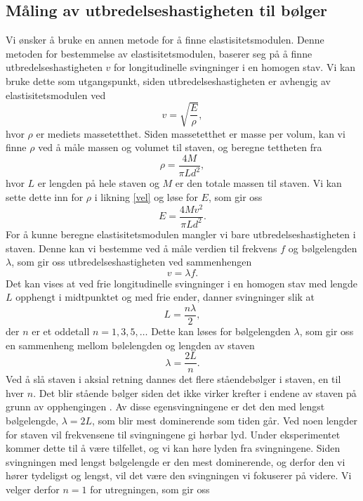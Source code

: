 \documentclass[%
 reprint,
nofootinbib,
aps,
]{revtex4-1}
\begin{document}
\subsection{Måling av utbredelseshastigheten til bølger}\label{teori-b}
Vi ønsker å bruke en annen metode for å finne elastisitetsmodulen. Denne metoden for bestemmelse av elastisitetsmodulen, baserer seg på å finne utbredelseshastigheten $v$ for longitudinelle svingninger i en homogen stav. Vi kan bruke dette som utgangspunkt, siden utbredelseshastigheten er avhengig av elastisitetsmodulen ved
\begin{equation}
  v = \sqrt{\frac{E}{\rho}},\label{vel}
\end{equation}
hvor $\rho$ er mediets massetetthet. Siden massetetthet er masse per volum, kan vi finne $\rho$ ved å måle massen og volumet til staven, og beregne tettheten fra
\begin{equation*}
  \rho = \frac{4M}{\pi L d^2},
\end{equation*}
hvor $L$ er lengden på hele staven og $M$ er den totale massen til staven. Vi kan sette dette inn for $\rho$ i likning \eqref{vel} og løse for $E$, som gir oss
\begin{equation}
  E = \frac{4Mv^2}{\pi L d^2}.\label{elast}
\end{equation}
For å kunne beregne elastisitetsmodulen mangler vi bare utbredelseshastigheten i staven. Denne kan vi bestemme ved å måle verdien til frekvens $f$ og bølgelengden $\lambda$, som gir oss utbredelseshastigheten ved sammenhengen
\begin{equation}
  v = \lambda f.\label{vlf}
\end{equation}
Det kan vises \cite{oppgave} at ved frie longitudinelle svingninger i en homogen stav med lengde $L$ opphengt i midtpunktet og med frie ender, danner svingninger slik at
\begin{equation*}
  L = \frac{n\lambda}{2},
\end{equation*}
der $n$ er et oddetall $n = 1, 3, 5, \ldots$ Dette kan løses for bølgelengden $\lambda$, som gir oss en sammenheng mellom bølelengden og lengden av staven
\begin{equation*}
  \lambda = \frac{2L}{n}.
\end{equation*}
Ved å slå staven i aksial retning dannes det flere ståendebølger i staven, en til hver $n$. Det blir stående bølger siden det ikke virker krefter i endene av staven på grunn av opphengingen \cite{oppgave}. Av disse egensvingningene er det den med lengst bølgelengde, $\lambda = 2L$, som blir mest dominerende som tiden går. Ved noen lengder for staven vil frekvensene til svingningene gi hørbar lyd. Under eksperimentet kommer dette til å være tilfellet, og vi kan høre lyden fra svingningene. Siden svingningen med lengst bølgelengde er den mest dominerende, og derfor den vi hører tydeligst og lengst, vil det være den svingningen vi fokuserer på videre. Vi velger derfor $n=1$ for utregningen, som gir oss
\end{document}
